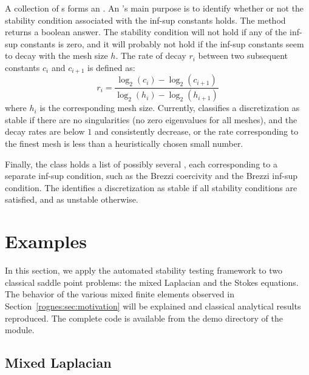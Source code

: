 A collection of s forms
an . An 's main purpose is
to identify whether or not the stability condition associated with the
inf-sup constants holds. The method  returns a boolean
answer. The stability condition will not hold if any of the inf-sup
constants is zero, and it will probably not hold if the inf-sup
constants seem to decay with the mesh size $h$.  The rate of decay
$r_i$ between two subsequent constants $c_i$ and $c_{i+1}$ is defined
as:
\begin{equation}
  r_i = \frac{\log_2(c_i) - \log_2(c_{i+1})}{\log_2(h_i) -
    \log_2(h_{i+1})}
\end{equation}
where $h_i$ is the corresponding mesh size. Currently, \rognesascot{}
classifies a discretization as stable if there are no singularities
(no zero eigenvalues for all meshes), and the decay rates are below
$1$ and consistently decrease, or the rate corresponding to the finest
mesh is less than a heuristically chosen small number.

Finally, the  class holds a list of possibly
several , each corresponding to a separate
inf-sup condition, such as the Brezzi coercivity and the Brezzi
inf-sup condition. The  identifies a
discretization as stable if all stability conditions are satisfied,
and as unstable otherwise.

\section{Examples}
\label{rognes:sec:examples}

In this section, we apply the automated stability testing framework to
two classical saddle point problems: the mixed Laplacian and the
Stokes equations. The behavior of the various mixed finite elements
observed in Section~\ref{rognes:sec:motivation} will be explained and
classical analytical results reproduced. The complete code is
available from the demo directory of the \rognesascot{} module.

\subsection{Mixed Laplacian}


